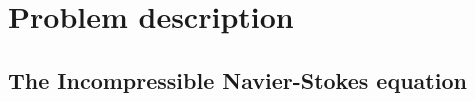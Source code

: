 
\chapter{Problem description} %

\label{description} %


\section{The Incompressible Navier-Stokes equation}

